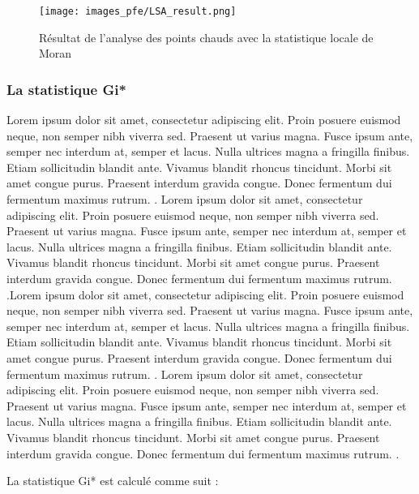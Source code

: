\medskip

\begin{figure}[hbt!]
  \centering
  \texttt{[image: images\_pfe/LSA\_result.png]}
  \caption{Résultat de l'analyse des points chauds avec la statistique locale de Moran \parencite{aguilar_distribution_2013}}
  \label{fig:lsa-result}
\end{figure}
\FloatBarrier

\medskip

\subsubsection{La statistique Gi*}
\label{subsec-gi-star}
Lorem ipsum dolor sit amet, consectetur adipiscing elit. Proin posuere euismod neque, non semper nibh viverra sed. Praesent ut varius magna. Fusce ipsum ante, semper nec interdum at, semper et lacus. Nulla ultrices magna a fringilla finibus. Etiam sollicitudin blandit ante. Vivamus blandit rhoncus tincidunt. Morbi sit amet congue purus. Praesent interdum gravida congue. Donec fermentum dui fermentum maximus rutrum. \parencite{getis_analysis_1992}. Lorem ipsum dolor sit amet, consectetur adipiscing elit. Proin posuere euismod neque, non semper nibh viverra sed. Praesent ut varius magna. Fusce ipsum ante, semper nec interdum at, semper et lacus. Nulla ultrices magna a fringilla finibus. Etiam sollicitudin blandit ante. Vivamus blandit rhoncus tincidunt. Morbi sit amet congue purus. Praesent interdum gravida congue. Donec fermentum dui fermentum maximus rutrum. \parencite{kalinic_kernel_2018}.Lorem ipsum dolor sit amet, consectetur adipiscing elit. Proin posuere euismod neque, non semper nibh viverra sed. Praesent ut varius magna. Fusce ipsum ante, semper nec interdum at, semper et lacus. Nulla ultrices magna a fringilla finibus. Etiam sollicitudin blandit ante. Vivamus blandit rhoncus tincidunt. Morbi sit amet congue purus. Praesent interdum gravida congue. Donec fermentum dui fermentum maximus rutrum. \parencite{getis_analysis_1992}. Lorem ipsum dolor sit amet, consectetur adipiscing elit. Proin posuere euismod neque, non semper nibh viverra sed. Praesent ut varius magna. Fusce ipsum ante, semper nec interdum at, semper et lacus. Nulla ultrices magna a fringilla finibus. Etiam sollicitudin blandit ante. Vivamus blandit rhoncus tincidunt. Morbi sit amet congue purus. Praesent interdum gravida congue. Donec fermentum dui fermentum maximus rutrum. \parencite{kalinic_kernel_2018}.
\medskip

La statistique Gi* est calculé comme suit \parencite{getis_analysis_1992}:

